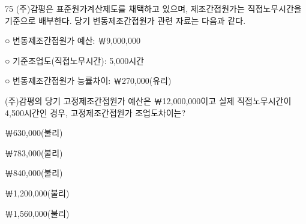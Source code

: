 \begin{question}{75}
(주)감평은 표준원가계산제도를 채택하고 있으며, 제조간접원가는 직접노무시간을 기준으로 배부한다. 당기 변동제조간접원가 관련 자료는 다음과 같다.
\begin{framedtext}
○ 변동제조간접원가 예산: ￦9,000,000 \par
○ 기준조업도(직접노무시간): 5,000시간 \par
○ 변동제조간접원가 능률차이: ￦270,000(유리) \par
\end{framedtext}
(주)감평의 당기 고정제조간접원가 예산은 ￦12,000,000이고 실제 직접노무시간이 4,500시간인 경우, 고정제조간접원가 조업도차이는? \par
\begin{choices}
  \item ￦630,000(불리)
  \item ￦783,000(불리)
  \item ￦840,000(불리)
  \item ￦1,200,000(불리)
  \item ￦1,560,000(불리)
\end{choices}
\end{question}

